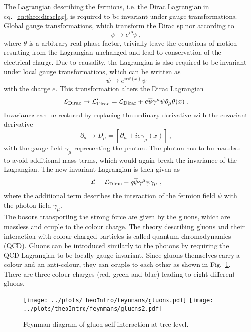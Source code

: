 \noindent The Lagrangian describing the fermions, i.e. the Dirac Lagrangian in eq.~\ref{eq:theo:diraclag}, is required to be invariant under gauge transformations. Global gauge transformations, which transform the Dirac spinor according to
\begin{equation}
\psi\rightarrow e^{i\theta}\psi ~,
\end{equation}
where $\theta$ is a arbitrary real phase factor, trivially leave the equations of motion resulting from the Lagrangian unchanged and lead to conservation of the electrical charge. Due to causality, the Lagrangian is also required to be invariant under local gauge transformations, which can be written as
\begin{equation}
\psi\rightarrow e^{ie\theta(x)}\psi
\end{equation} 
with the charge $e$. This transformation alters the Dirac Lagrangian
\begin{equation}
\mathcal{L}_{\rm Dirac} \rightarrow \mathcal{L}_{\rm Dirac}' = \mathcal{L}_{\rm Dirac} + e\overline{\psi}\gamma^\mu\psi\partial_\mu \theta(x) ~.
\end{equation}
Invariance can be restored by replacing the ordinary derivative with the covariant derivative
\begin{equation}
\partial_\mu \rightarrow D_\mu = [\partial_\mu + ie\gamma_\mu(x)] ~,
\end{equation}
with the gauge field $\gamma_\mu$ representing the photon. The photon has to be massless to avoid additional mass terms, which would again break the invariance of the Lagrangian. The new invariant Lagrangian is then given as
\begin{equation}
\mathcal{L} = \mathcal{L}_{\rm Dirac} - q\overline{\psi}\gamma^\mu\psi \gamma_\mu ~,
\end{equation}
where the additional term describes the interaction of the fermion field $\psi$ with the photon field $\gamma_\mu$.\\

\noindent The bosons transporting the strong force are given by the gluons, which are massless and couple to the colour charge. The theory describing gluons and their interaction with colour-charged particles is called quantum chromodynamics (QCD). Gluons can be introduced similarly to the photons by requiring the QCD-Lagrangian to be locally gauge invariant. Since gluons themselves carry a colour and an anti-colour, they can couple to each other as shown in Fig.~\ref{fig:theo:gluoncoupling}. There are three colour charges (red, green and blue) leading to eight different gluons.\\
\begin{figure}
	\centering
	\texttt{[image: ../plots/theoIntro/feynmans/gluons.pdf]}
	\texttt{[image: ../plots/theoIntro/feynmans/gluons2.pdf]}
	\caption[Feynman diagram of gluon self-interaction at tree-level]{Feynman diagram of gluon self-interaction at tree-level.}
	\label{fig:theo:gluoncoupling}
\end{figure}

